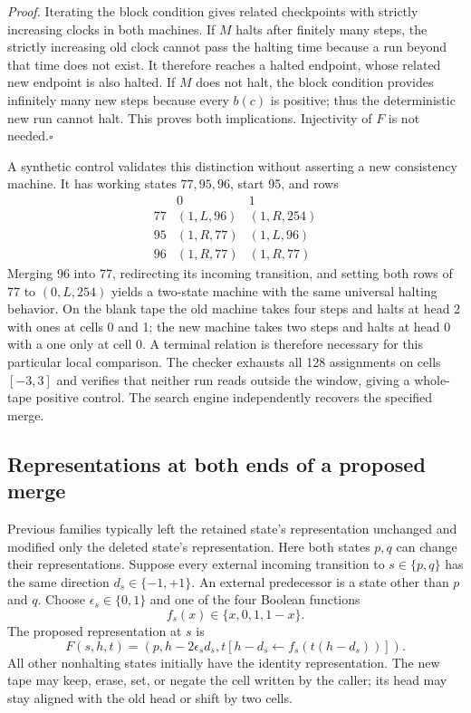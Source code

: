 \emph{Proof.} Iterating the block condition gives related checkpoints with
strictly increasing clocks in both machines. If $M$ halts after finitely many
steps, the strictly increasing old clock cannot pass the halting time because
a run beyond that time does not exist. It therefore reaches a halted endpoint,
whose related new endpoint is also halted. If $M$ does not halt, the block
condition provides infinitely many new steps because every $b(c)$ is positive;
thus the deterministic new run cannot halt. This proves both implications.
Injectivity of $F$ is not needed.\hfill$\square$

A synthetic control validates this distinction without asserting a new
consistency machine. It has working states $77,95,96$, start 95, and rows
\[
\begin{array}{c|cc}
 &0&1\\\hline
77&(1,L,96)&(1,R,254)\\
95&(1,R,77)&(1,L,96)\\
96&(1,R,77)&(1,R,77)
\end{array}
\]
Merging 96 into 77, redirecting its incoming transition, and setting both rows
of 77 to $(0,L,254)$ yields a two-state machine with the same universal halting
behavior. On the blank tape the old machine takes four steps and halts at head
2 with ones at cells 0 and 1; the new machine takes two steps and halts at head
0 with a one only at cell 0. A terminal relation is therefore necessary for this
particular local comparison. The checker exhausts all 128 assignments on cells
$[-3,3]$ and verifies that neither run reads outside the window, giving a
whole-tape positive control. The search engine independently recovers the
specified merge.

\subsection{Representations at both ends of a proposed merge}

Previous families typically left the retained state's representation unchanged
and modified only the deleted state's representation. Here both states $p,q$
can change their representations. Suppose every external incoming transition
to $s\in\{p,q\}$ has the same direction $d_s\in\{-1,+1\}$. An external
predecessor is a state other than $p$ and $q$. Choose $\epsilon_s\in\{0,1\}$
and one of the four Boolean functions
\[
 f_s(x)\in\{x,0,1,1-x\}.
\]
The proposed representation at $s$ is
\[
 F(s,h,t)=
 \left(p,h-2\epsilon_s d_s,
 t[h-d_s\leftarrow f_s(t(h-d_s))]\right).
\]
All other nonhalting states initially have the identity representation.
The new tape may keep, erase, set, or negate the cell written by the caller;
its head may stay aligned with the old head or shift by two cells.

